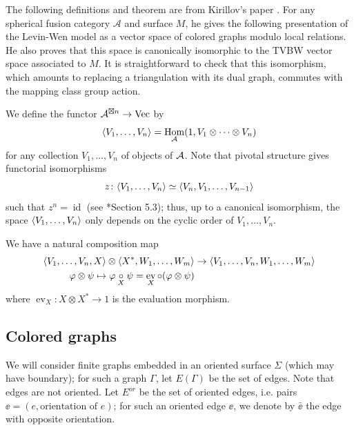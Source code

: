 \documentclass{amsart}
\DeclareMathOperator{\id}{id}
\DeclareMathOperator{\Vect}{Vec}
\DeclareMathOperator{\Hom}{Hom}
\DeclareMathOperator{\ev}{ev}
\newcommand{\one}{1}
\newcommand{\Ga}{\Gamma}
\newcommand{\ph}{\varphi}
\newcommand{\Si}{\Sigma}
\begin{document}
The following definitions and theorem are from Kirillov's paper
 \cite{kirillovStringNets}.  For any spherical fusion category $\mathcal A$
and surface $M$, he gives the following presentation of the Levin-Wen model
as a vector space of colored graphs modulo
local relations.  He also proves that this space 
is canonically isomorphic to the TVBW vector space associated to $M$.  It is
straightforward to check that this isomorphism, which amounts to replacing a 
triangulation with its dual graph,  commutes with the mapping class group action.


We define the functor $\A^{\boxtimes n}\to \Vect$ by
\begin{equation}\label{e:vev}
\<V_1,\dots,V_n\>=\Hom_\A(\one,
V_1\otimes\dots\otimes V_n)
\end{equation}
for any collection $V_1,\dots, V_n$ of objects of $\mathcal{A}$. Note that pivotal
structure gives functorial isomorphisms
\begin{equation}\label{e:cyclic}
z\colon\langle V_1,\dots,V_n\rangle\simeq \langle V_n, V_1,\dots,V_{n-1}\rangle
\end{equation}
such that $z^n=\id$ (see \cite{BK}*{Section 5.3}); thus, up to a canonical
isomorphism, the space $\langle V_1,\dots,V_n\rangle$ only depends on the cyclic order
of $V_1,\dots, V_n$.

We have a natural composition map 
\begin{equation}\label{e:composition}
\begin{aligned}
 \<V_1,\dots,V_n, X\>\otimes\<X^*, W_1,\dots,
W_m\>&\to\<V_1,\dots,V_n, W_1,\dots, W_m\>\\
\ph\otimes\psi\mapsto \ph\cc{X}\psi= \ev_X\circ (\ph\otimes\psi)
\end{aligned}
\end{equation}
where $\ev_X\colon X\otimes  X^*\to \one$ is the evaluation morphism.

\subsection{Colored graphs}\label{s:colored}

We will consider finite  graphs embedded in an oriented surface $\Si$
(which may have boundary); for such a
graph $\Ga$, let $E(\Ga)$ be the set of edges. Note that edges are not
oriented. Let $E^{or}$ be the set of oriented edges, i.e. pairs $\ee=(e,
\text{orientation of } e)$; for such an oriented edge $\ee$, we denote by
$\bar{\ee}$ the edge with opposite orientation.
\end{document}
